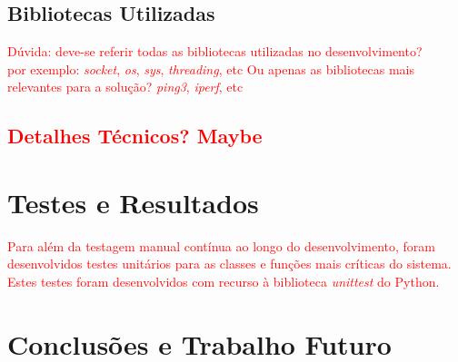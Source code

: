 \documentclass[a4paper,12pt]{scrreprt}
\begin{document}
\section{Bibliotecas Utilizadas}

\textcolor{red}{
    Dúvida: deve-se referir todas as bibliotecas utilizadas no desenvolvimento? \\
    por exemplo: \textit{socket}, \textit{os}, \textit{sys}, \textit{threading}, etc
    Ou apenas as bibliotecas mais relevantes para a solução? \textit{ping3}, \textit{iperf}, etc
}

\section{\textcolor{red}{Detalhes Técnicos? Maybe}}



\chapter{Testes e Resultados}

\textcolor{red}{
    Para além da testagem manual contínua ao longo do desenvolvimento, foram
    desenvolvidos testes unitários para as classes e funções mais críticas do
    sistema. Estes testes foram desenvolvidos com recurso à biblioteca
    \textit{unittest} do Python.
}



\chapter{Conclusões e Trabalho Futuro}

\end{document}

